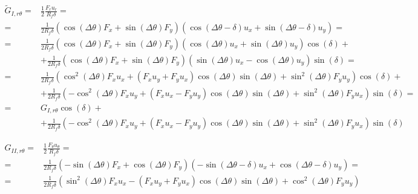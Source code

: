 \documentclass[a4paper]{jpconf}
\begin{document}
\begin{equation}
\begin{split}
\widetilde{G}_{I,r\theta} = &\frac{1}{2}\frac{F_{r}u_{r}}{R_{f}\delta}=\\
= &\frac{1}{2R_{f}\delta}\left(\cos\left(\Delta\theta\right) F_{x}+\sin\left(\Delta\theta\right)F_{y}\right)\left(\cos\left(\Delta\theta-\delta\right) u_{x}+\sin\left(\Delta\theta-\delta\right) u_{y}\right)=\\
= &\frac{1}{2R_{f}\delta}\left(\cos\left(\Delta\theta\right) F_{x}+\sin\left(\Delta\theta\right)F_{y}\right)\left(\cos\left(\Delta\theta\right) u_{x}+\sin\left(\Delta\theta\right) u_{y}\right)\cos\left(\delta\right)+\\
&+\frac{1}{2R_{f}\delta}\left(\cos\left(\Delta\theta\right) F_{x}+\sin\left(\Delta\theta\right)F_{y}\right)\left(\sin\left(\Delta\theta\right) u_{x}-\cos\left(\Delta\theta\right) u_{y}\right)\sin\left(\delta\right)=\\
= &\frac{1}{2R_{f}\delta}\left(\cos^{2}\left(\Delta\theta\right) F_{x}u_{x}+\left(F_{x}u_{y}+F_{y}u_{x}\right)\cos\left(\Delta\theta\right)\sin\left(\Delta\theta\right)+\sin^{2}\left(\Delta\theta\right)F_{y}u_{y}\right)\cos\left(\delta\right)+\\
&+\frac{1}{2R_{f}\delta}\left(-\cos^{2}\left(\Delta\theta\right) F_{x}u_{y}+\left(F_{x}u_{x}-F_{y}u_{y}\right)\cos\left(\Delta\theta\right)\sin\left(\Delta\theta\right)+\sin^{2}\left(\Delta\theta\right)F_{y}u_{x}\right)\sin\left(\delta\right)=\\
= &G_{I,r\theta}\cos\left(\delta\right)+\\
&+\frac{1}{2R_{f}\delta}\left(-\cos^{2}\left(\Delta\theta\right) F_{x}u_{y}+\left(F_{x}u_{x}-F_{y}u_{y}\right)\cos\left(\Delta\theta\right)\sin\left(\Delta\theta\right)+\sin^{2}\left(\Delta\theta\right)F_{y}u_{x}\right)\sin\left(\delta\right)
\end{split}
\end{equation}

\begin{equation}
\begin{split}
G_{II,r\theta} = &\frac{1}{2}\frac{F_{\theta}u_{\theta}}{R_{f}\delta}=\\
= &\frac{1}{2R_{f}\delta}\left(-\sin\left(\Delta\theta\right) F_{x}+\cos\left(\Delta\theta\right)F_{y}\right)\left(-\sin\left(\Delta\theta-\delta\right) u_{x}+\cos\left(\Delta\theta-\delta\right) u_{y}\right)=\\
= &\frac{1}{2R_{f}\delta}\left(\sin^{2}\left(\Delta\theta\right) F_{x}u_{x}-\left(F_{x}u_{y}+F_{y}u_{x}\right)\cos\left(\Delta\theta\right)\sin\left(\Delta\theta\right)+\cos^{2}\left(\Delta\theta\right)F_{y}u_{y}\right)\\
\end{split}
\end{equation}
\end{document}

